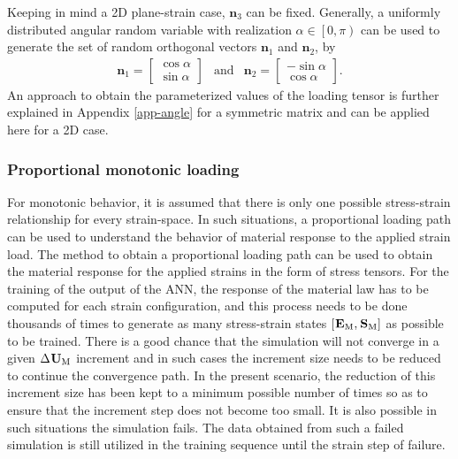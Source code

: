 Keeping in mind a 2D plane-strain case, $  \textbf{n}_3 $ can be fixed. Generally, a uniformly distributed angular random variable with realization $ \alpha\in\left[ 0,\pi \right) $ can be used to generate the set of random orthogonal vectors $ \textbf{n}_1 $ and $ \textbf{n}_2 $, by
\begin{eqnarray}\label{eq-nn-gen4}
\textbf{n}_1=
\begin{bmatrix}
\cos\alpha \\
\sin\alpha
\end{bmatrix}
& \text{and} & \textbf{n}_2=
\begin{bmatrix}
-\sin\alpha\\
\cos\alpha
\end{bmatrix}.
\end{eqnarray} 
An approach to obtain the parameterized values of the loading tensor is further explained in Appendix \ref{app-angle} for a symmetric matrix and can be applied here for a 2D case.

\subsubsection{Proportional monotonic loading}\label{nn-gendata-propdata}
For monotonic behavior, it is assumed that there is only one possible stress-strain relationship for every strain-space. In such situations, a proportional loading path can be used to understand the behavior of material response to the applied strain load. The method to obtain a proportional loading path can be used to obtain the material response for the applied strains in the form of stress tensors. For the training of the output of the ANN, the response of the material law has to be computed for each strain configuration, and this process needs to be done thousands of times to generate as many stress-strain states $ \left[\tgm[]{E},\tgm[]{S}\right] $ as possible to be trained. There is a good chance that the simulation will not converge in a given $ \Delta\tgm[]{U} $ increment and in such cases the increment size needs to be reduced to continue the convergence path. In the present scenario, the reduction of this increment size has been kept to a minimum possible number of times so as to ensure that the increment step does not become too small. It is also possible in such situations the simulation fails. The data obtained from such a failed simulation is still utilized in the training sequence until the strain step of failure.

